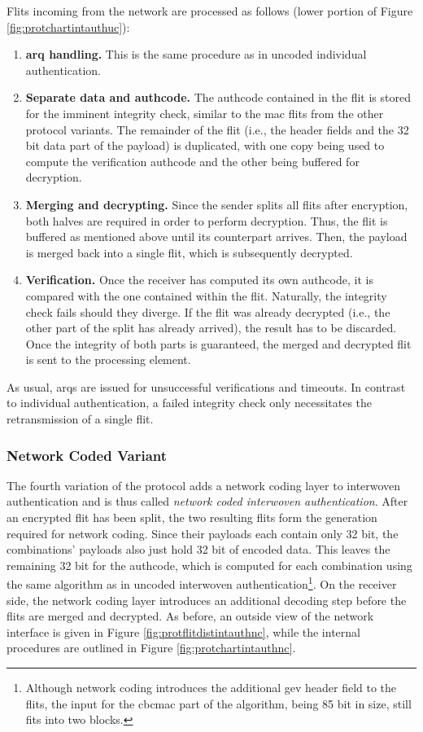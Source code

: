 Flits incoming from the network are processed as follows (lower portion of Figure \ref{fig:protchartintauthuc}):
\begin{enumerate}
    \item \textbf{\Gls{arq} handling.} This is the same procedure as in uncoded individual authentication.
    \item \textbf{Separate data and authcode.} The authcode contained in the flit is stored for the imminent integrity check, similar to the
        \gls{mac} flits from the other protocol variants. The remainder of the flit (i.e., the header fields and the 32 bit data part of the payload)
        is duplicated, with one copy being used to compute the verification authcode and the other being buffered for decryption.
    \item \textbf{Merging and decrypting.} Since the sender splits all flits after encryption, both halves are required in order to perform
        decryption. Thus, the flit is buffered as mentioned above until its counterpart arrives. Then, the payload is merged back into a single flit,
        which is subsequently decrypted.
    \item \textbf{Verification.} Once the receiver has computed its own authcode, it is compared with the one contained within the flit. Naturally,
        the integrity check fails should they diverge. If the flit was already decrypted (i.e., the other part of the split has already arrived), the
        result has to be discarded. Once the integrity of both parts is guaranteed, the merged and decrypted flit is sent to the processing element.
\end{enumerate}
\vspace{0.5\baselineskip}

As usual, \glspl{arq} are issued for unsuccessful verifications and timeouts. In contrast to individual authentication, a failed integrity check only
necessitates the retransmission of a single flit.

\subsubsection{Network Coded Variant}
The fourth variation of the protocol adds a network coding layer to interwoven authentication and is thus called \textit{network coded interwoven
authentication}. After an encrypted flit has been split, the two resulting flits form the generation required for network coding. Since their payloads
each contain only 32 bit, the combinations' payloads also just hold 32 bit of encoded data. This leaves the remaining 32 bit for the authcode, which is
computed for each combination using the same algorithm as in uncoded interwoven authentication\footnote{Although network coding introduces the
additional \gls{gev} header field to the flits, the input for the \gls{cbcmac} part of the algorithm, being 85 bit in size, still fits into two
blocks.}. On the receiver side, the network coding layer introduces an additional decoding step before the flits are merged and decrypted. As before,
an outside view of the network interface is given in Figure \vref{fig:protflitdistintauthnc}, while the internal procedures are outlined in Figure
\vref{fig:protchartintauthnc}.

